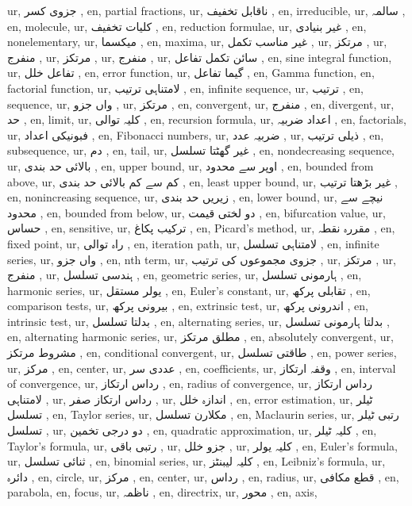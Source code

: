 ur, جزوی کسر ,
en, partial fractions,
ur, ناقابل تخفیف ,
en, irreducible,
ur, سالمہ ,
en, molecule,
ur, کلیات تخفیف ,
en, reduction formulae,
ur, غیر بنیادی ,
en, nonelementary,
ur, میکسما ,
en, maxima,
ur, غیر مناسب تکمل ,
ur, مرتکز ,
ur, منفرج ,
ur, مرتکز ,
ur, منفرج ,
ur, سائن تکمل تفاعل ,
en, sine integral function,
ur, تفاعل خلل ,
en, error function,
ur, گیما تفاعل ,
en, Gamma function,
en, factorial function,
ur, لامتناہی ترتیب ,
en, infinite sequence,
ur, ترتیب ,
en, sequence,
ur,  واں جزو ,
ur, مرتکز ,
en, convergent,
ur, منفرج ,
en, divergent,
ur, حد ,
en, limit,
ur, کلیہ توالی ,
en, recursion formula,
ur, اعداد ضربیہ ,
en, factorials,
ur, فبونیکی اعداد ,
en, Fibonacci numbers,
ur, ضربیہ عدد ,
ur, ذیلی ترتیب ,
en, subsequence,
ur, دم ,
en, tail,
ur, غیر گھٹتا تسلسل ,
en, nondecreasing sequence,
ur, بالائی حد بندی ,
en, upper bound,
ur, اوپر سے محدود ,
en, bounded from above,
ur, کم سے کم بالائی حد بندی ,
en, least upper bound,
ur, غیر بڑھتا ترتیب ,
en, nonincreasing sequence,
ur, زیریں حد بندی ,
en, lower bound,
ur, نیچے سے محدود ,
en, bounded from below,
ur, دو لختی قیمت ,
en, bifurcation value,
ur, حساس ,
en, sensitive,
ur, ترکیب پکاغ ,
en, Picard's method,
ur, مقررہ نقطہ ,
en, fixed point,
ur, راہ توالی ,
en, iteration path,
ur, لامتناہی تسلسل ,
en, infinite series,
ur,  واں جزو ,
en, nth term,
ur, جزوی مجموعوں کی ترتیب ,
ur, مرتکز ,
ur, منفرج ,
ur, ہندسی تسلسل ,
en, geometric series,
ur, ہارمونی تسلسل ,
en, harmonic series,
ur, یولر مستقل ,
en, Euler's constant,
ur, تقابلی پرکھ ,
en, comparison tests,
ur, بیرونی پرکھ ,
en, extrinsic test,
ur, اندرونی پرکھ ,
en, intrinsic test,
ur, بدلتا تسلسل ,
en, alternating series,
ur, بدلتا ہارمونی تسلسل ,
en, alternating harmonic series,
ur, مطلق مرتکز ,
en, absolutely convergent,
ur, مشروط مرتکز ,
en, conditional convergent,
ur, طاقتی تسلسل ,
en, power series,
ur, مرکز ,
en, center,
ur, عددی سر ,
en, coefficients,
ur, وقفہ ارتکاز ,
en, interval of convergence,
ur, رداس ارتکاز ,
en, radius of convergence,
ur, رداس ارتکاز لامتناہی ,
ur, رداس ارتکاز صفر ,
ur, اندازہ خلل ,
en, error estimation,
ur, ٹیلر تسلسل ,
en, Taylor series,
ur, مکلارن تسلسل ,
en, Maclaurin series,
ur,  رتبی ٹیلر تسلسل ,
ur, دو درجی تخمین ,
en, quadratic approximation,
ur, کلیہ ٹیلر ,
en, Taylor's formula,
ur,  رتبی باقی ,
ur, جزو خلل ,
ur, کلیہ یولر ,
en, Euler's formula,
ur, ثنائی تسلسل ,
en, binomial series,
ur, کلیہ لیبنٹز ,
en, Leibniz's formula,
ur, دائرہ ,
en, circle,
ur, مرکز ,
en, center,
ur, رداس ,
en, radius,
ur, قطع مکافی ,
en, parabola,
en, focus,
ur, ناظمہ ,
en, directrix,
ur, محور ,
en, axis,
